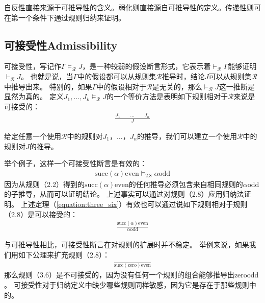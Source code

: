 自反性直接来源于可推导性的含义。弱化则直接源自可推导性的定义。传递性则可在第一个条件下通过规则归纳来证明。

\subsection{可接受性Admissibility}

可接受性，写记作$\Gamma \vDash_{\mathcal{R}} J$，是一种较弱的假设断言形式，它表示着$\vdash_{\mathcal{R}} \Gamma$能够证明$\vdash_{\mathcal{R}} J$。
也就是说，当$ \Gamma $中的假设都可以从规则集$ \mathcal {R} $推导时，结论$ J $可以从规则集$ \mathcal {R} $中推导出来。
特别的，如果$\Gamma$中的假设相对于$\mathcal{R}$是无关的，那么$\vdash_{\mathcal{R}} J$这一推断是显然为真的。
定义$J_1,\dots,J_k\vDash_\mathcal{R} J $的一个等价方法是表明如下规则相对于$\mathcal{R}$来说是可接受的：
\begin{equation}
    \begin{aligned}
        \frac{J_1 \qquad \dots \qquad J_n}{J}
    \end{aligned}
\end{equation}

给定任意一个使用$ \mathcal{R} $中的规则对$ J_1，\dots，J_n $的推导，我们可以建立一个使用$ \mathcal {R} $中的规则对$ J $的推导。

举个例子，这样一个可接受性断言是有效的：
\begin{equation}
    \begin{aligned}
        \text{succ}(\alpha) \text{even} \vDash_{2.8} \alpha \text{odd} \label{equation:three_six}
    \end{aligned}
\end{equation}
因为从规则（2.2）得到的$ \text{succ}(\alpha) \text{even} $的任何推导必须包含来自相同规则的$ \alpha \text{odd} $的子推导，从而可以证明结论。
上述事实可以通过对规则（2.8）应用归纳法证明。
上述定理（\ref{equation:three_six}）有效也可以通过说如下规则相对于规则（2.8）是可以接受的：
\begin{equation}
    \begin{aligned}
        \frac{\text{succ}(\alpha) \text{even}}{\alpha \text{odd}}
    \end{aligned}
\end{equation}

与可推导性相比，可接受性断言在对规则的扩展时并不稳定。
举例来说，如果我们用如下公理来扩充规则（2.8）：
\begin{equation}
    \begin{aligned}
        \frac{ }{\text{succ}(\text{zero}) \text{even}}
    \end{aligned}
\end{equation}
那么规则（3.6）是不可接受的，因为没有任何一个规则的组合能够推导出$\text{zero} \text{odd}$。
可接受性对于归纳定义中缺少哪些规则同样敏感，因为它是存在于那些规则中的。

